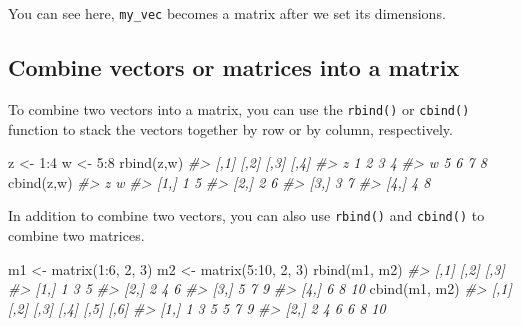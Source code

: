 \documentclass[
]{book}
\newenvironment{Shaded}{\begin{snugshade}}{\end{snugshade}}
\newcommand{\CommentTok}[1]{\textcolor[rgb]{0.56,0.35,0.01}{\textit{#1}}}
\newcommand{\DecValTok}[1]{\textcolor[rgb]{0.00,0.00,0.81}{#1}}
\newcommand{\FunctionTok}[1]{\textcolor[rgb]{0.00,0.00,0.00}{#1}}
\newcommand{\NormalTok}[1]{#1}
\newcommand{\OtherTok}[1]{\textcolor[rgb]{0.56,0.35,0.01}{#1}}
\newcommand{\SpecialCharTok}[1]{\textcolor[rgb]{0.00,0.00,0.00}{#1}}
\begin{document}
You can see here, \texttt{my\_vec} becomes a matrix after we set its dimensions.

\hypertarget{combine-vectors-or-matrices-into-a-matrix}{%
\subsection{Combine vectors or matrices into a matrix}\label{combine-vectors-or-matrices-into-a-matrix}}

To combine two vectors into a matrix, you can use the \texttt{rbind()} or \texttt{cbind()} function to stack the vectors together by row or by column, respectively.

\begin{Shaded}
\begin{Highlighting}[]
\NormalTok{z }\OtherTok{\textless{}{-}} \DecValTok{1}\SpecialCharTok{:}\DecValTok{4}
\NormalTok{w }\OtherTok{\textless{}{-}} \DecValTok{5}\SpecialCharTok{:}\DecValTok{8}
\FunctionTok{rbind}\NormalTok{(z,w)}
\CommentTok{\#\textgreater{}   [,1] [,2] [,3] [,4]}
\CommentTok{\#\textgreater{} z    1    2    3    4}
\CommentTok{\#\textgreater{} w    5    6    7    8}
\FunctionTok{cbind}\NormalTok{(z,w)}
\CommentTok{\#\textgreater{}      z w}
\CommentTok{\#\textgreater{} [1,] 1 5}
\CommentTok{\#\textgreater{} [2,] 2 6}
\CommentTok{\#\textgreater{} [3,] 3 7}
\CommentTok{\#\textgreater{} [4,] 4 8}
\end{Highlighting}
\end{Shaded}

In addition to combine two vectors, you can also use \texttt{rbind()} and \texttt{cbind()} to combine two matrices.

\begin{Shaded}
\begin{Highlighting}[]
\NormalTok{m1 }\OtherTok{\textless{}{-}} \FunctionTok{matrix}\NormalTok{(}\DecValTok{1}\SpecialCharTok{:}\DecValTok{6}\NormalTok{, }\DecValTok{2}\NormalTok{, }\DecValTok{3}\NormalTok{)}
\NormalTok{m2 }\OtherTok{\textless{}{-}} \FunctionTok{matrix}\NormalTok{(}\DecValTok{5}\SpecialCharTok{:}\DecValTok{10}\NormalTok{, }\DecValTok{2}\NormalTok{, }\DecValTok{3}\NormalTok{)}
\FunctionTok{rbind}\NormalTok{(m1, m2)}
\CommentTok{\#\textgreater{}      [,1] [,2] [,3]}
\CommentTok{\#\textgreater{} [1,]    1    3    5}
\CommentTok{\#\textgreater{} [2,]    2    4    6}
\CommentTok{\#\textgreater{} [3,]    5    7    9}
\CommentTok{\#\textgreater{} [4,]    6    8   10}
\FunctionTok{cbind}\NormalTok{(m1, m2)}
\CommentTok{\#\textgreater{}      [,1] [,2] [,3] [,4] [,5] [,6]}
\CommentTok{\#\textgreater{} [1,]    1    3    5    5    7    9}
\CommentTok{\#\textgreater{} [2,]    2    4    6    6    8   10}
\end{Highlighting}
\end{Shaded}
\end{document}
